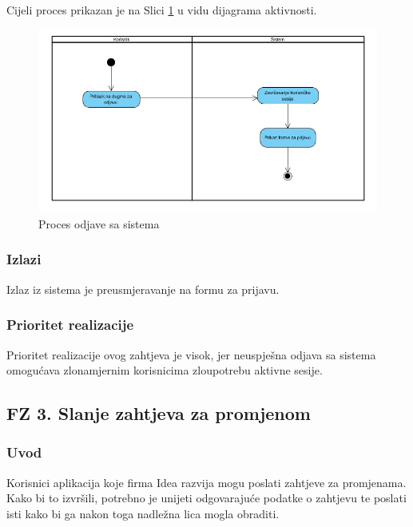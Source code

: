 \documentclass[12pt,a4paper]{article}
\begin{document}
Cijeli proces prikazan je na Slici \ref{act2} u vidu dijagrama aktivnosti.

\begin{figure}[H]
\center
\includegraphics[scale=0.5]{../res/Activity/activity2.JPG}
\caption{Proces odjave sa sistema}
\label{act2}
\end{figure}

\subsubsection{Izlazi}

Izlaz iz sistema je preusmjeravanje na formu za prijavu.

\subsubsection{Prioritet realizacije}

Prioritet realizacije ovog zahtjeva je visok, jer neuspješna odjava sa sistema omogućava zlonamjernim korisnicima zloupotrebu aktivne sesije.

\newpage

\subsection{FZ 3. Slanje zahtjeva za promjenom}

\subsubsection{Uvod}

Korisnici aplikacija koje firma Idea razvija mogu poslati zahtjeve za promjenama. Kako bi to izvršili, potrebno je unijeti odgovarajuće podatke o zahtjevu te poslati isti kako bi ga nakon toga nadležna lica mogla obraditi.
\end{document}
